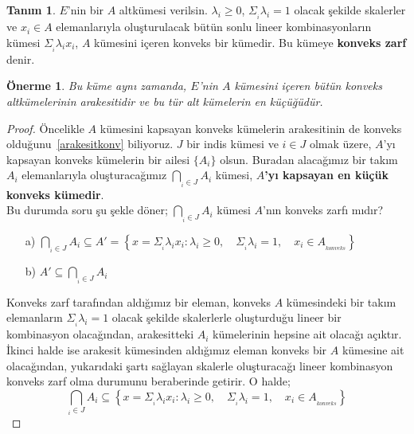 \documentclass[11pt]{article}
\theoremstyle{plain}
\newtheorem{proposition}{Önerme}
\theoremstyle{definition}
\newtheorem{definition}{Tanım}
\theoremstyle{remark}
\numberwithin{equation}{section}
\renewcommand{\%}{{\small \%}}
\begin{document}
\begin{definition}
$E$'nin bir $A$ altkümesi verilsin. $\lambda_i \geq 0$, $\Sigma_{_i}\lambda_i =1$ olacak şekilde skalerler ve $x_i \in A$ elemanlarıyla oluşturulacak bütün sonlu lineer kombinasyonların kümesi $\Sigma_{_i}\lambda_i x_i$, $A$ kümesini içeren konveks bir kümedir. Bu kümeye \textbf{konveks zarf} denir.

\end{definition}
\begin{proposition} Bu küme aynı zamanda, $E$'nin $A$ kümesini içeren bütün konveks altkümelerinin arakesitidir ve bu tür alt kümelerin en küçüğüdür.\end{proposition}
\begin{proof}
Öncelikle $A$ kümesini kapsayan konveks kümelerin arakesitinin de konveks olduğunu~\ref{arakesitkonv} biliyoruz. $J$ bir indis kümesi ve $i\in J$ olmak üzere, $A$'yı kapsayan konveks kümelerin bir ailesi $\{A_i\}$ olsun. Buradan alacağımız bir takım $A_i$ elemanlarıyla oluşturacağımız $\bigcap_{_i\in J}A_i$ kümesi, \textbf{$A$'yı kapsayan en küçük konveks kümedir}.\\
Bu durumda soru şu şekle döner; $\bigcap_{_i\in J}A_i$ kümesi $A$'nın konveks zarfı mıdır?
\begin{itemize}
\item[a)]  $\bigcap_{_i\in J}A_i\subseteq  A'=\left\{x=\Sigma_{_i}\lambda_i x_i :\lambda_i \geq 0, \quad\Sigma_{_i}\lambda_i =1, \quad x_i\in A_{_{konveks}} \right\}$
\item[b)] $A'\subseteq\bigcap_{_i\in J}A_i$
\end{itemize}
Konveks zarf tarafından aldığımız bir eleman, konveks $A$ kümesindeki bir takım elemanların $\Sigma_{_i}\lambda_i =1$ olacak şekilde skalerlerle oluşturduğu lineer bir kombinasyon olacağından, arakesitteki $A_i$ kümelerinin hepsine ait olacağı açıktır. İkinci halde ise arakesit kümesinden aldığımız eleman konveks bir $A$ kümesine ait olacağından, yukarıdaki şartı sağlayan skalerle oluşturacağı lineer kombinasyon konveks zarf olma durumunu beraberinde getirir. O halde;
\[
\bigcap_{_i\in J}A_i\subseteq \left\{x=\Sigma_{_i}\lambda_i x_i :\lambda_i \geq 0, \quad\Sigma_{_i}\lambda_i =1, \quad x_i\in A_{_{konveks}} \right\}
\]
\end{proof}
\end{document}
